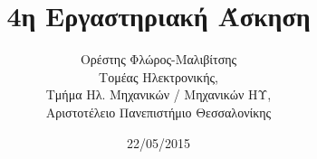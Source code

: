 \usepackage{varwidth}
\usetikzlibrary{external}
\tikzexternalize
\newcommand{\deloldext}[2]{%
   \immediate\write18{./deloldext.pl '#1' '#2'}
}
\newcommand{\includetikz}[1]{%
    \tikzsetnextfilename{#1}%
    \deloldext{#1.tikz}{#1.pdf}%
}

\usepackage{fontspec}
\setmainfont{DejaVu Serif}
\renewcommand{\contentsname}{Περιεχόμενα}
\renewcommand{\listfigurename}{Λίστα Σχημάτων}
\renewcommand{\figurename}{Σχήμα}
\renewcommand{\lstlistingname}{Καταχώρηση}%
\renewcommand{\lstlistlistingname}{List of \lstlistingname s}




\title{4η Εργαστηριακή Άσκηση}
\author{Ορέστης Φλώρος-Μαλιβίτσης\\
  Τομέας Ηλεκτρονικής,\\
  Τμήμα Ηλ. Μηχανικών / Μηχανικών ΗΥ,\\
  Αριστοτέλειο Πανεπιστήμιο Θεσσαλονίκης}
\date{22/05/2015}

\newcommand{\fakealign}{%
   \mbox{\hspace{5cm}} & \mbox{\hspace{5cm}} \nonumber\\%
}


\maketitle
\tableofcontents
\listoffigures
\newpage


